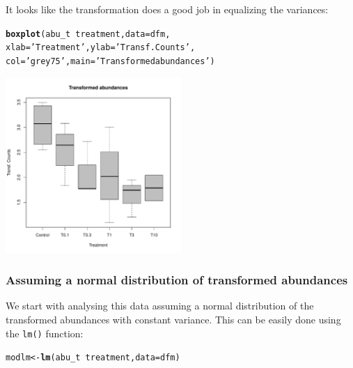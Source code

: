 \documentclass{scrartcl}\usepackage[]{graphicx}\usepackage[]{color}
\makeatletter
\newcommand{\hlstr}[1]{\textcolor[rgb]{0.192,0.494,0.8}{#1}}%
\newcommand{\hlopt}[1]{\textcolor[rgb]{0,0,0}{#1}}%
\newcommand{\hlstd}[1]{\textcolor[rgb]{0.345,0.345,0.345}{#1}}%
\newcommand{\hlkwb}[1]{\textcolor[rgb]{0.69,0.353,0.396}{#1}}%
\newcommand{\hlkwc}[1]{\textcolor[rgb]{0.333,0.667,0.333}{#1}}%
\newcommand{\hlkwd}[1]{\textcolor[rgb]{0.737,0.353,0.396}{\textbf{#1}}}%
\newenvironment{kframe}{%
 \def\at@end@of@kframe{}%
 \ifinner\ifhmode%
  \def\at@end@of@kframe{\end{minipage}}%
  \begin{minipage}{\columnwidth}%
 \fi\fi%
 \def\FrameCommand##1{\hskip\@totalleftmargin \hskip-\fboxsep
 \colorbox{shadecolor}{##1}\hskip-\fboxsep
     \hskip-\linewidth \hskip-\@totalleftmargin \hskip\columnwidth}%
 \MakeFramed {\advance\hsize-\width
   \@totalleftmargin\z@ \linewidth\hsize
   \@setminipage}}%
 {\par\unskip\endMakeFramed%
 \at@end@of@kframe}
\newenvironment{knitrout}{}{} %
\makeatother
\begin{document}
It looks like the transformation does a good job in equalizing the variances:
\begin{knitrout}
\color{fgcolor}\begin{kframe}
\begin{alltt}
\hlkwd{boxplot}\hlstd{(abu_t} \hlopt{~} \hlstd{treatment,} \hlkwc{data} \hlstd{= dfm,}
        \hlkwc{xlab} \hlstd{=} \hlstr{'Treatment'}\hlstd{,} \hlkwc{ylab} \hlstd{=} \hlstr{'Transf. Counts'}\hlstd{,}
        \hlkwc{col} \hlstd{=} \hlstr{'grey75'}\hlstd{,} \hlkwc{main} \hlstd{=} \hlstr{'Transformed abundances'}\hlstd{)}
\end{alltt}
\end{kframe}
\includegraphics[width=0.5\textwidth]{figure/plot_count_trans-1} 

\end{knitrout}


\subsubsection{Assuming a normal distribution of transformed abundances}
We start with analysing this data assuming a normal distribution of the transformed abundances with constant variance.
This can be easily done using the \texttt{lm()} function:

\begin{knitrout}
\color{fgcolor}\begin{kframe}
\begin{alltt}
\hlstd{modlm} \hlkwb{<-} \hlkwd{lm}\hlstd{(abu_t} \hlopt{~} \hlstd{treatment,} \hlkwc{data} \hlstd{= dfm)}
\end{alltt}
\end{kframe}
\end{knitrout}
\end{document}
